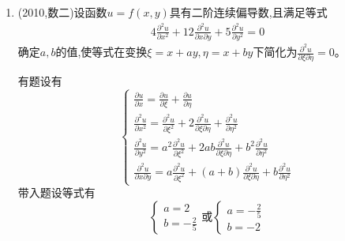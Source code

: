 \documentclass[12pt, a4paper, oneside, UTF8]{ctexbook}
\begin{document}
\begin{enumerate}[label=\arabic*.,start=8]
    \item (2010,数二)设函数$u=f(x,y)$具有二阶连续偏导数,且满足等式
    \begin{align*}
        4\frac{\partial^2 u}{\partial x^2}+12\frac{\partial^2 u}{\partial x\partial y}+5\frac{\partial^2 u}{\partial y^2}=0
    \end{align*}
    确定$a,b$的值,使等式在变换$\xi=x+ay,\eta=x+by$下简化为$\frac{\partial^2 u}{\partial \xi\partial \eta}=0$。
    
    \begin{solution}
    有题设有 
    $$
    \begin{cases}
        \displaystyle 
        \frac{\partial u}{\partial x} = \frac{\partial u}{\partial \xi} + \frac{\partial u}{\partial \eta} \\
        \displaystyle
        \frac{\partial^2 u}{\partial x^2} = \frac{\partial^2 u}{\partial \xi^2} + 2\frac{\partial^2 u}{\partial\xi\partial\eta}
        +\frac{\partial^2 u}{\partial \eta^2} \\
        \displaystyle
        \frac{\partial^2 u}{\partial y^2} = a^2\frac{\partial^2 u}{\partial \xi^2} + 2ab\frac{\partial^2 u}{\partial\xi\partial\eta}
        +b^2\frac{\partial^2 u}{\partial \eta^2} \\
        \displaystyle 
        \frac{\partial^2 u}{\partial x\partial y} = a\frac{\partial^2 u}{\partial \xi^2} + (a+b)\frac{\partial^2 u}{\partial\xi\partial\eta}
        +b\frac{\partial^2 u}{\partial \eta^2} 
    \end{cases}
    $$
    带入题设等式有
    $$
    \begin{cases}
        a = 2 \\
        b = -\frac{2}{5}
    \end{cases} \text{或} 
    \begin{cases}
        a = -\frac{2}{5} \\
        b = -2
    \end{cases}
    $$
    \end{solution}
\end{enumerate}
\end{document}
